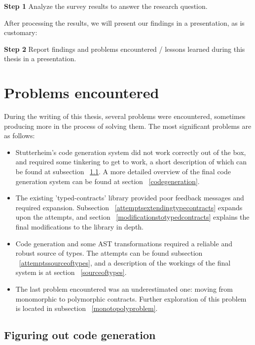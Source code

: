 \documentclass[10pt,a4paper]{article}
\begin{document}
\begin{description}
	\item{\textbf{Step 1}} Analyze the survey results to answer the research question.
\end{description}

After processing the results, we will present our findings in a presentation, as is customary:

\begin{description}
	\item{\textbf{Step 2}} Report findings and problems encountered / lessons learned during this thesis in a presentation.
\end{description}

\section{Problems encountered}
During the writing of this thesis, several problems were encountered, sometimes producing more in the process of solving them.
The most significant problems are as follows:

\begin{itemize}
\item Stutterheim's code generation system did not work correctly out of the box, and required some tinkering to get to work, a short description of which can be found at subsection ~\ref{figuringoutcodegeneration}. A more detailed overview of the final code generation system can be found at section ~\ref{codegeneration}.
\item The existing 'typed-contracts' library provided poor feedback messages and required expansion. Subsection ~\ref{attemptsextendingtypecontracts} expands upon the attempts, and section ~\ref{modificationstotypedcontracts} explains the final modifications to the library in depth.
\item Code generation and some AST transformations required a reliable and robust source of types. The attempts can be found subsection ~\ref{attemptssourceoftypes}, and a description of the workings of the final system is at section ~\ref{sourceoftypes}.
\item The last problem encountered was an underestimated one: moving from monomorphic to polymorphic contracts. Further exploration of this problem is located in subsection ~\ref{monotopolyproblem}.
\end{itemize} 

\subsection{Figuring out code generation}
\label{figuringoutcodegeneration}
\end{document}
